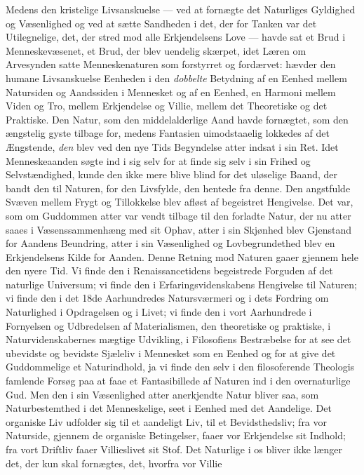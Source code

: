 \documentclass[12pt,a4paper,openany]{book}
\newcommand{\opage}[1]{\marginnote{\footnotesize\textit{[#1]}}}
\begin{document}
Medens den kristelige Livsanskuelse --- ved at fornægte det
Naturliges Gyldighed og Væsenlighed og ved at sætte Sandheden
i det, der for Tanken var det Utilegnelige, det, der
stred mod alle Erkjendelsens Love --- havde sat et Brud i
Menneskevæsenet, et Brud, der blev uendelig skærpet, idet
Læren om Arvesynden satte Menneskenaturen som forstyrret og
fordærvet: hævder den humane Livsanskuelse Eenheden i den
\emph{dobbelte} Betydning af en Eenhed mellem Natursiden og
\opage{493}Aandssiden i Mennesket og af en Eenhed, en Harmoni
mellem Viden og Tro, mellem Erkjendelse og Villie, mellem
det Theoretiske og det Praktiske. Den Natur, som den middelalderlige
Aand havde fornægtet, som den ængstelig gyste tilbage
for, medens Fantasien uimodstaaelig lokkedes af det
Ængstende, \emph{den} blev ved den nye Tids Begyndelse atter
indsat i sin Ret. Idet Menneskeaanden søgte ind i sig selv
for at finde sig selv i sin Frihed og Selvstændighed, kunde
den ikke mere blive blind for det uløselige Baand, der bandt
den til Naturen, for den Livsfylde, den hentede fra denne.
Den angstfulde Svæven mellem Frygt og Tillokkelse blev
afløst af begeistret Hengivelse. Det var, som om Guddommen
atter var vendt tilbage til den forladte Natur, der nu atter
saaes i Væsenssammenhæng med sit Ophav, atter i sin
Skjønhed blev Gjenstand for Aandens Beundring, atter i
sin Væsenlighed og Lovbegrundethed blev en Erkjendelsens
Kilde for Aanden. Denne Retning mod Naturen gaaer
gjennem hele den nyere Tid. Vi finde den i Renaissancetidens
begeistrede Forguden af det naturlige Universum; vi
finde den i Erfaringsvidenskabens Hengivelse til Naturen; vi
finde den i det 18de Aarhundredes Natursværmeri og i dets
Fordring om Naturlighed i Opdragelsen og i Livet; vi finde
den i vort Aarhundrede i Fornyelsen og Udbredelsen af
Materialismen, den theoretiske og praktiske, i Naturvidenskabernes
mægtige Udvikling, i Filosofiens Bestræbelse for at
see det ubevidste og bevidste Sjæleliv i Mennesket som en
Eenhed og for at give det Guddommelige et Naturindhold, ja
vi finde den selv i den filosoferende Theologis famlende
Forsøg paa at faae et Fantasibillede af Naturen ind i den
overnaturlige Gud. Men den i sin Væsenlighed atter
anerkjendte Natur bliver saa, som Naturbestemthed i det
Menneskelige, seet i Eenhed med det Aandelige. Det organiske
Liv udfolder sig til et aandeligt Liv, til et Bevidsthedsliv;
fra vor Naturside, gjennem de organiske Betingelser,
faaer vor Erkjendelse sit Indhold; fra vort Driftliv
faaer Villieslivet sit Stof. Det Naturlige i os bliver ikke
\opage{494}længer det, der kun skal fornægtes, det, hvorfra vor Villie
\end{document}
